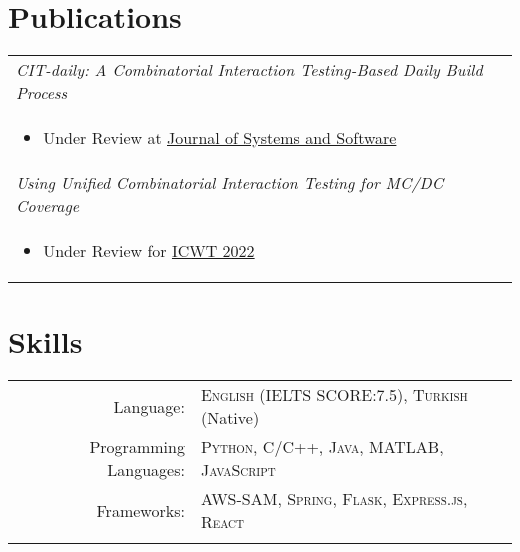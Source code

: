 \documentclass[a4paper,10pt]{article} %
\begin{document}


\section{Publications}

\begin{longtable}{p{12cm}}

\emph{CIT-daily: A Combinatorial Interaction Testing-Based Daily Build Process} \\ \begin{itemize} \item \footnotesize{Under Review at \href{https://www.journals.elsevier.com/journal-of-systems-and-software}{Journal of Systems and Software}} \end{itemize}\\

\emph{Using Unified Combinatorial Interaction Testing for MC/DC Coverage} \\ \begin{itemize} \item \footnotesize{Under Review for \href{https://icst2022.vrain.upv.es/home/iwct-2022}{ICWT 2022}} \end{itemize}\\

\end{longtable}




\section{Skills}

\begin{longtable}{rl}
Language: & \textsc{English} \small(IELTS SCORE:7.5), \textsc{Turkish} \small(Native)\\

Programming Languages: & \textsc{Python}, \textsc{C/C++}, \textsc{Java}, \textsc{MATLAB}, \textsc{JavaScript}\\

Frameworks: & \textsc{AWS-SAM}, \textsc{Spring}, \textsc{Flask}, \textsc{Express.js}, \textsc{React}\\
&\\
\end{longtable}
\end{document}
